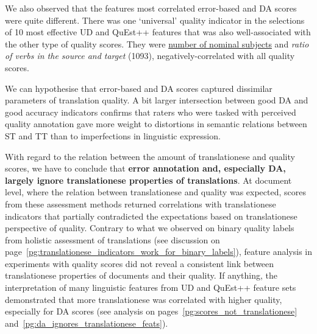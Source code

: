 We also observed that the features most correlated error-based and DA scores were quite different. There was one `universal' quality indicator in the selections of 10 most effective UD and QuEst++ features that was also well-associated with the other type of quality scores. They were \hyperlink{ft:nsubj}{number of nominal subjects} and \textit{ratio of verbs in the source and target} (1093), negatively-correlated with all quality scores.

We can hypothesise that error-based and DA scores captured dissimilar parameters of translation quality. A bit larger intersection between good DA and good accuracy indicators confirms that raters who were tasked with perceived quality annotation gave more weight to distortions in semantic relations between ST and TT than to imperfections in linguistic expression.

With regard to the relation between the amount of translationese and quality scores, we have to conclude that \textbf{error annotation and, especially DA, largely ignore translationese properties of translations}. 
At document level, where the relation between translationese and quality was expected, scores from these assessment methods returned correlations with translationese indicators that partially contradicted the expectations based on translationese perspective of quality. 
Contrary to what we observed on binary quality labels from holistic assessment of translations (see discussion on page~\ref{pg:translationese_indicators_work_for_binary_labels}), feature analysis in experiments with quality scores did not reveal a consistent link between translationese properties of documents and their quality. 
If anything, the interpretation of many linguistic features from UD and QuEst++ feature sets demonstrated that more translationese was correlated with higher quality, especially for DA scores (see analysis on pages~\ref{pg:scores_not_translationese} and~\ref{pg:da_ignores_translationese_feats}).
